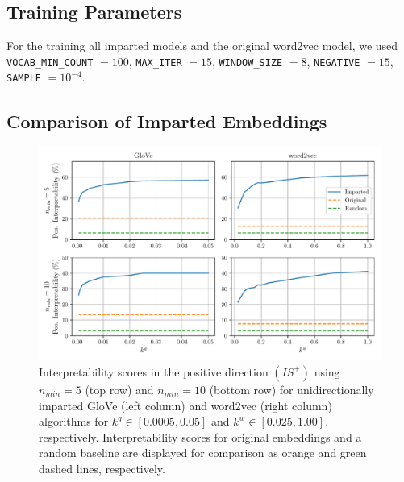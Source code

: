 \documentclass[11pt,a4paper]{article}
\begin{document}








\subsection{Training Parameters}
\label{app:training_parameters}

 For the training all imparted models and the original word2vec model, we used \verb|VOCAB_MIN_COUNT| $=100$, \verb|MAX_ITER| $=15$, \verb|WINDOW_SIZE| $=8$, \verb|NEGATIVE| $=15$, \verb|SAMPLE| $=10^{-4}$.
 
 
 
 
 
 
 
 \subsection{Comparison of Imparted Embeddings}
\label{app:impart_comparison}


\begin{figure}
	\centering
	\includegraphics[width=16cm]{Figures/interpretability_glove_vs_word2vec.pdf}
	\caption{Interpretability scores in the positive direction $(IS^+)$ using $n_{min}=5$ (top row) and $n_{min}=10$ (bottom row) for unidirectionally imparted GloVe (left column) and word2vec (right column) algorithms for $k^g \in [0.0005,0.05]$ and $k^w \in [0.025,1.00]$, respectively. Interpretability scores for original embeddings and a random baseline are displayed for comparison as orange and green dashed lines, respectively.}
	\label{fig:g_vs_w2v}
\end{figure}
\end{document}
